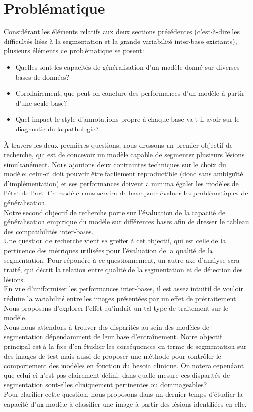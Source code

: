 \section{Problématique}
\label{sec:SegmentationProblematique}
Considérant les éléments relatifs aux deux sections précédentes (c'est-à-dire les difficultés liées à la segmentation et la grande variabilité inter-base existante), plusieurs éléments de problématique se posent: 
\begin{itemize}
	\item Quelles sont les capacités de généralisation d'un modèle donné sur diverses bases de données?
	\item Corollairement, que peut-on conclure des performances d'un modèle à partir d'une seule base?
	\item Quel impact le style d'annotations propre à chaque base va-t-il avoir sur le diagnostic de la pathologie?
\end{itemize}
À travers les deux premières questions, nous dressons un premier objectif de recherche, qui est de concevoir un modèle capable de segmenter plusieurs lésions simultanément. Nous ajoutons deux contraintes techniques sur le choix du modèle: celui-ci doit pouvoir être facilement reproductible (donc sans ambiguïté d'implémentation) et ses performances doivent a minima égaler les modèles de l'état de l'art. Ce modèle nous servira de base pour évaluer les problématiques de généralisation.
\\
Notre second objectif de recherche porte sur l'évaluation de la capacité de généralisation empirique du modèle sur différentes bases afin de dresser le tableau des compatibilités inter-bases. \\
Une question de recherche vient se greffer à cet objectif, qui est celle de la pertinence des métriques utilisées pour l'évaluation de la qualité de la segmentation. Pour répondre à ce questionnement, un autre axe d'analyse sera traité, qui décrit la relation entre qualité de la segmentation et de détection des lésions. 
\\
En vue d'uniformiser les performances inter-bases, il est assez intuitif de vouloir réduire la variabilité entre les images présentées par un effet de prétraitement. Nous proposons d'explorer l'effet qu'induit un tel type de traitement sur le modèle.
\\
Nous nous attendons à trouver des disparités au sein des modèles de segmentation dépendamment de leur base d'entraînement. Notre objectif principal est à la fois d'en étudier les conséquences en terme de segmentation sur des images de test mais aussi de proposer une méthode pour contrôler le comportement des modèles en fonction du besoin clinique. On notera cependant que celui-ci n'est pas clairement défini:
dans quelle mesure ces disparités de segmentation sont-elles cliniquement pertinentes ou dommageables? \\
Pour clarifier cette question, nous proposons dans un dernier temps d'étudier la capacité d'un modèle à classifier une image à partir des lésions identifiées en elle. 

